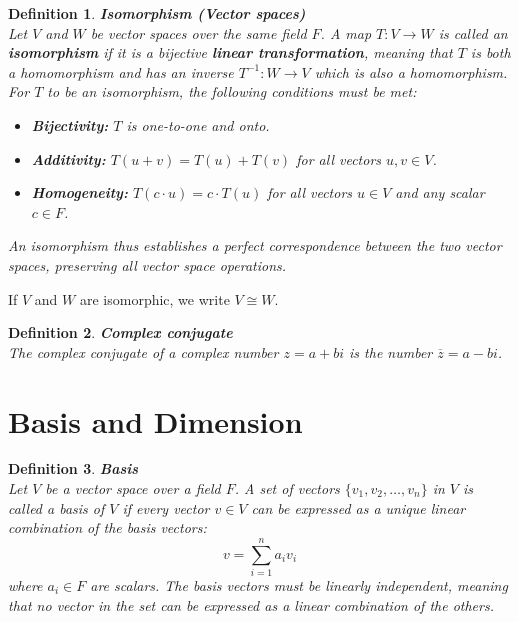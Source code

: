 \documentclass[11pt]{book} %
\newtheorem{definition}{Definition}[section]
\begin{document}
\begin{definition}{\textbf{Isomorphism (Vector spaces)}} \\
    Let \( V \) and \( W \) be vector spaces over the same field \( F \). 
    A map \( T: V \to W \) is called an \textbf{isomorphism} if it is a bijective \textbf{linear transformation}, 
    meaning that \( T \) is both a homomorphism and has an inverse \( T^{-1}: W \to V \) which is also a homomorphism. 
    For \( T \) to be an isomorphism, the following conditions must be met:
    \begin{itemize}
        \item \textbf{Bijectivity:} \( T \) is one-to-one and onto.
        \item \textbf{Additivity:} \( T(u + v) = T(u) + T(v) \) for all vectors \( u, v \in V \).
        \item \textbf{Homogeneity:} \( T(c \cdot u) = c \cdot T(u) \) for all vectors \( u \in V \) and any scalar \( c \in F \).
    \end{itemize}
    An isomorphism thus establishes a perfect correspondence between the two vector spaces, preserving all vector space operations.
\end{definition}

If \(V\) and \(W\) are isomorphic, we write \(V \cong W\).


\begin{definition}{\textbf{Complex conjugate}} \\
    The complex conjugate of a complex number \( z = a + bi \) is the number \( \overline{z} = a - bi \).
\end{definition}

\section{Basis and Dimension}

\begin{definition}{\textbf{Basis}} \\
    Let \( V \) be a vector space over a field \( F \). A set of vectors \( \{v_1, v_2, \dots, v_n\} \) in \( V \) is called a basis of \( V \) if every vector \( v \in V \) can be expressed as a unique linear combination of the basis vectors:
    \[
    v = \sum_{i=1}^n a_i v_i
    \]
    where \( a_i \in F \) are scalars. The basis vectors must be linearly independent, meaning that no vector in the set can be expressed as a linear combination of the others.
\end{definition}
\end{document}
